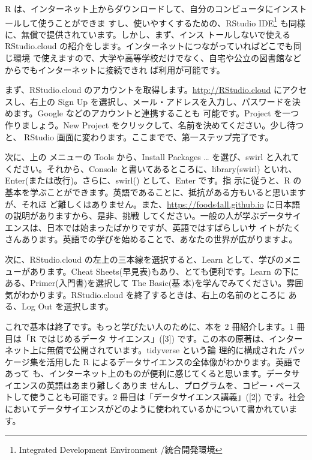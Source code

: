 \documentclass[
]{book}
\theoremstyle{definition}
\theoremstyle{definition}
\theoremstyle{definition}
\theoremstyle{definition}
\theoremstyle{remark}
\begin{document}
R は、インターネット上からダウンロードして、自分のコンピュータにインストールして使うことができま すし、使いやすくするための、RStudio IDE\footnote{Integrated Development Environment /統合開発環境} も同様に、無償で提供されています。しかし、まず、インス トールしないで使える RStudio.cloud の紹介をします。インターネットにつながっていればどこでも同じ環境 で使えますので、大学や高等学校だけでなく、自宅や公立の図書館などからでもインターネットに接続できれ ば利用が可能です。

まず、RStudio.cloud のアカウントを取得します。\url{http://RStudio.cloud} にアクセスし、右上の Sign Up を選択し、メール・アドレスを入力し、パスワードを決めます。Google などのアカウントと連携することも 可能です。Project を一つ作りましょう。New Project をクリックして、名前を決めてください。少し待つと、 RStudio 画面に変わります。ここまでで、第一ステップ完了です。

次に、上の メニューの Tools から、Install Packages \ldots{} を選び、swirl と入れてください。それから、Console と書いてあるところに、library(swirl) といれ、Enter(または改行)。さらに、swirl() として、Enter です。指 示に従うと、R の基本を学ぶことができます。英語であることに、抵抗がある方もいると思いますが、それほ ど難しくはありません。また、\url{https://foods4all.github.io} に日本語の説明がありますから、是非、挑戦 してください。一般の人が学ぶデータサイエンスは、日本では始まったばかりですが、英語ではすばらしいサ イトがたくさんあります。英語での学びを始めることで、あなたの世界が広がりますよ。

次に、RStudio.cloud の左上の三本線を選択すると、Learn として、学びのメニューがあります。Cheat Sheets(早見表)もあり、とても便利です。Learn の下にある、Primer(入門書)を選択して The Basic(基 本)を学んでみてください。雰囲気がわかります。RStudio.cloud を終了するときは、右上の名前のところに ある、Log Out を選択します。

これで基本は終了です。もっと学びたい人のために、本を 2 冊紹介します。1 冊目は「R ではじめるデータ サイエンス」({[}3{]}) です。この本の原著は、インターネット上に無償で公開されています。tidyverse という論 理的に構成された パッケージ集を活用した R によるデータサイエンスの全体像がわかります。英語であって も、インターネット上のものが便利に感じてくると思います。データサイエンスの英語はあまり難しくありま せんし、プログラムを、コピー・ペーストして使うことも可能です。2 冊目は「データサイエンス講義」({[}2{]}) です。社会においてデータサイエンスがどのように使われているかについて書かれています。
\end{document}
